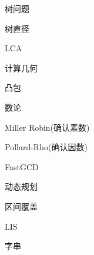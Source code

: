 \documentclass{article}
\begin{document}
\begin{enumerate}
{\bf \LARGE \item 树问题}
	
	\begin{itemize}
	
	{\bf \item 树直径}
	

	{\bf \item LCA}
	
	
	
	\end{itemize}
	
{\bf \LARGE \item 计算几何}

	\begin{itemize}
	
	{\bf \item 凸包}
		
	
	\end{itemize}

{\bf \LARGE \item 数论}

	\begin{itemize}
	
	{\bf \item Miller Robin(确认素数)}
		
	
	{\bf \item Pollard-Rho(确认因数)}	
	
	
	{\bf \item FastGCD}
	
	
	\end{itemize}

{\bf \LARGE \item  动态规划}

	\begin{itemize}
	
	{\bf \item 区间覆盖}
		
	
	{\bf \item  LIS}
		
	
	
	\end{itemize}

{\bf \LARGE \item  字串}


\end{enumerate}
\end{document}
